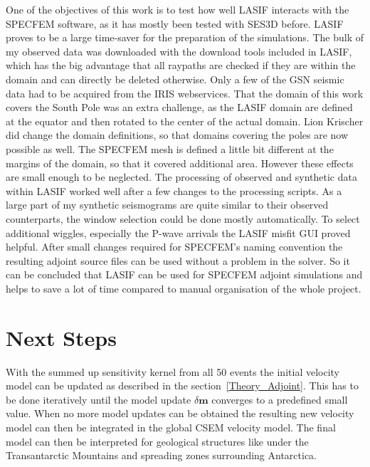 One of the objectives of this work is to test how well LASIF interacts with the SPECFEM software,
as it has mostly been tested with SES3D before.
LASIF proves to be a large time-saver for the preparation of the simulations. 
The bulk of my observed data was downloaded with the download tools included in LASIF, which 
has the big advantage that all raypaths are checked if they are within the domain and can 
directly be deleted otherwise.
Only a few of the GSN seismic data had to be acquired from the IRIS webservices.
That the domain of this work covers the South Pole was an extra challenge, as the LASIF domain
are defined at the equator and then rotated to the center of the actual domain.
Lion Krischer did change the domain definitions, so that domains covering the poles  are now 
possible as well. 
The SPECFEM mesh is defined a little bit different at the margins of the domain, so that it 
covered additional area. However these effects are small enough to be neglected.
The processing of observed and synthetic data within LASIF worked well after a few changes to
the processing scripts.
As a large part of my synthetic seismograms are quite similar to their observed counterparts,
the window selection could be done mostly automatically. 
To select additional wiggles, especially the P-wave arrivals the LASIF misfit GUI proved helpful.
After small changes required for SPECFEM's naming convention the resulting adjoint source files
can be used without a problem in the solver.
So it can be concluded that LASIF can be used for SPECFEM adjoint simulations and helps to save a 
lot of time compared to manual organisation of the whole project.


\section{Next Steps}

With the summed up sensitivity kernel from all 50 events the initial velocity
model can be updated as described in the section~\ref{Theory_Adjoint}.
This has to be done iteratively until the model update $\delta \boldsymbol{m}$
converges to a predefined small value.
When no more model updates can be obtained the resulting new velocity model 
can then be integrated in the global CSEM velocity model.
The final model can then be interpreted for geological structures like 
under the Transantarctic Mountains and spreading zones surrounding Antarctica.

\vspace*{1cm}
